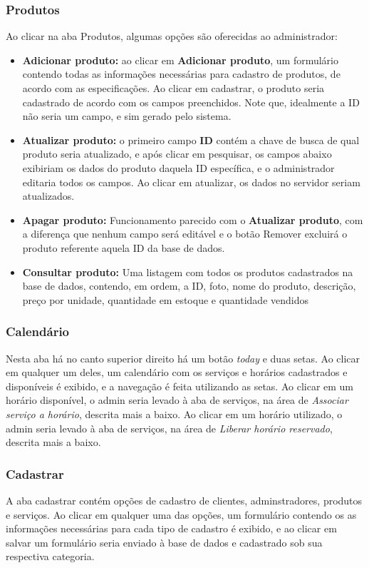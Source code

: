 \documentclass[10pt,a4paper]{article}
\begin{document}
\subsubsection{Produtos}
Ao clicar na aba Produtos, algumas opções são oferecidas ao administrador:
\begin{itemize}
\item \textbf{Adicionar produto:} ao clicar em \textbf{Adicionar produto}, um formulário contendo todas as informações necessárias para cadastro de produtos, de acordo com as especificações. Ao clicar em cadastrar, o produto seria cadastrado de acordo com os campos preenchidos. Note que, idealmente a ID não seria um campo, e sim gerado pelo sistema.
\item \textbf{Atualizar produto:} o primeiro campo \textbf{ID} contém a chave de busca de qual produto seria atualizado, e após clicar em pesquisar, os campos abaixo exibiriam os dados do produto daquela ID específica, e o administrador editaria todos os campos. Ao clicar em atualizar, os dados no servidor seriam atualizados.
\item \textbf{Apagar produto:} Funcionamento parecido com o \textbf{Atualizar produto}, com a diferença que nenhum campo será editável e o botão Remover excluirá o produto referente aquela ID da base de dados.
\item \textbf{Consultar produto:} Uma listagem com todos os produtos cadastrados na base de dados, contendo, em ordem, a ID, foto, nome do produto, descrição, preço por unidade, quantidade em estoque e quantidade vendidos
\end{itemize}
\subsubsection{Calendário}
Nesta aba há no canto superior direito há um botão \textit{today} e duas setas. Ao clicar em qualquer um deles, um calendário com os serviços e horários cadastrados e disponíveis é exibido, e a navegação é feita utilizando as setas. Ao clicar em um horário disponível, o admin seria levado à aba de serviços,  na área de \textit{Associar serviço a horário}, descrita mais a baixo. Ao clicar em um horário utilizado, o admin seria levado à aba de serviços,  na área de \textit{Liberar horário reservado}, descrita mais a baixo.
\subsubsection{Cadastrar}
A aba cadastrar contém opções de cadastro de clientes, adminstradores, produtos e serviços. Ao clicar em qualquer uma das opções, um formulário contendo os as informações necessárias para cada tipo de cadastro é exibido, e ao clicar em salvar um formulário seria enviado à base de dados e cadastrado sob sua respectiva categoria.
\end{document}
